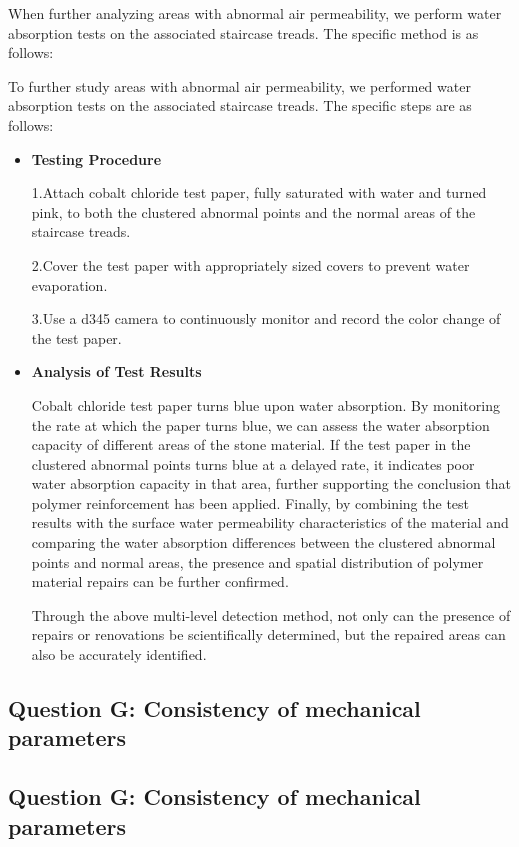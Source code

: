 \documentclass{mcmthesis}
\begin{document}
When further analyzing areas with abnormal air permeability, we perform water absorption tests on the associated staircase treads. The specific method is as follows:

To further study areas with abnormal air permeability, we performed water absorption tests on the associated staircase treads. The specific steps are as follows:

\begin{itemize}[label=$\diamond$]
\item \textbf{Testing Procedure}

1.Attach cobalt chloride test paper, fully saturated with water and turned pink, to both the clustered abnormal points and the normal areas of the staircase treads.

2.Cover the test paper with appropriately sized covers to prevent water evaporation.

3.Use a d345 camera to continuously monitor and record the color change of the test paper.


\item \textbf{Analysis of Test Results}


Cobalt chloride test paper turns blue upon water absorption. By monitoring the rate at which the paper turns blue, we can assess the water absorption capacity of different areas of the stone material.
If the test paper in the clustered abnormal points turns blue at a delayed rate, it indicates poor water absorption capacity in that area, further supporting the conclusion that polymer reinforcement has been applied.
Finally, by combining the test results with the surface water permeability characteristics of the material and comparing the water absorption differences 
between the clustered abnormal points and normal areas, the presence and spatial distribution of polymer material repairs can be further confirmed.

Through the above multi-level detection method, not only can the presence of repairs or renovations be scientifically determined, but the repaired areas can also be accurately identified.
\end{itemize}
\subsection{Question G: Consistency of mechanical parameters}
\subsection{Question G: Consistency of mechanical parameters}
\end{document}
